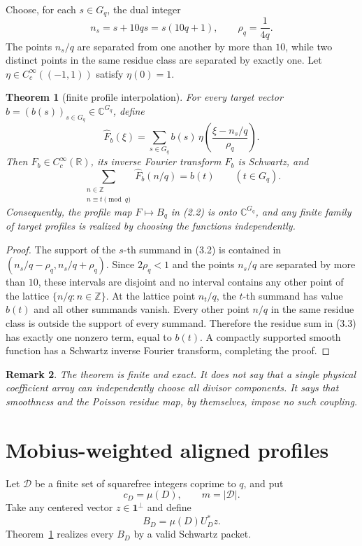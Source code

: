 \documentclass[11pt]{article}
\newtheorem{theorem}{Theorem}[section]
\newtheorem{remark}[theorem]{Remark}
\newcommand{\C}{\mathbb C}
\newcommand{\Z}{\mathbb Z}
\newcommand{\one}{\mathbf 1}
\newcommand{\Gq}{G_q}
\newcommand{\cD}{\mathcal D}
\begin{document}
Choose, for each $s\in\Gq$, the dual integer
\[
 n_s=s+10qs=s(10q+1),
 \qquad \rho_q=\frac1{4q}.
 \tag{3.1}
\]
The points $n_s/q$ are separated from one another by more than $10$, while
two distinct points in the same residue class are separated by exactly one.
Let $\eta\in C_c^\infty((-1,1))$ satisfy $\eta(0)=1$.

\begin{theorem}[finite profile interpolation]
\label{thm:interpolation}
For every target vector $b=(b(s))_{s\in\Gq}\in\C^{\Gq}$, define
\[
 \widehat F_b(\xi)=
 \sum_{s\in\Gq} b(s)\,
 \eta\!\left(\frac{\xi-n_s/q}{\rho_q}\right).
 \tag{3.2}
\]
Then $\widehat F_b\in C_c^\infty(\mathbb R)$, its inverse Fourier transform
$F_b$ is Schwartz, and
\[
 \sum_{\substack{n\in\Z\\ n\equiv t\pmod q}}
 \widehat F_b(n/q)=b(t)
 \qquad (t\in\Gq).
 \tag{3.3}
\]
Consequently, the profile map $F\mapsto B_q$ in (2.2) is onto
$\C^{\Gq}$, and any finite family of target profiles is realized by choosing
the functions independently.
\end{theorem}

\begin{proof}
The support of the $s$-th summand in (3.2) is contained in
$(n_s/q-\rho_q,n_s/q+\rho_q)$.  Since $2\rho_q<1$ and the points $n_s/q$
are separated by more than $10$, these intervals are disjoint and no interval
contains any other point of the lattice $\{n/q:n\in\Z\}$.  At the lattice
point $n_t/q$, the $t$-th summand has value $b(t)$ and all other summands
vanish.  Every other point $n/q$ in the same residue class is outside the
support of every summand.  Therefore the residue sum in (3.3) has exactly one
nonzero term, equal to $b(t)$.  A compactly supported smooth function has a
Schwartz inverse Fourier transform, completing the proof.
\end{proof}

\begin{remark}
The theorem is finite and exact.  It does not say that a single physical
coefficient array can independently choose all divisor components.  It says
that smoothness and the Poisson residue map, by themselves, impose no such
coupling.
\end{remark}

\section{Mobius-weighted aligned profiles}

Let $\cD$ be a finite set of squarefree integers coprime to $q$, and put
\[
 c_D=\mu(D),\qquad m=\lvert\cD\rvert.
 \tag{4.1}
\]
Take any centered vector $z\in\one^\perp$ and define
\[
 B_D=\mu(D)U_D^*z.
 \tag{4.2}
\]
Theorem~\ref{thm:interpolation} realizes every $B_D$ by a valid Schwartz
packet.
\end{document}
